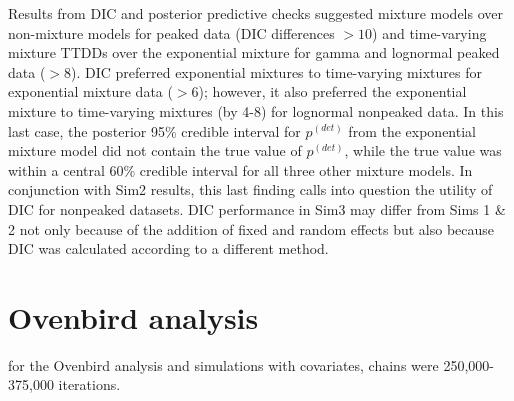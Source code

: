 \documentclass[useAMS,usenatbib,referee,12pt]{article}
\newcommand{\adam}[1]{{\color{blue} ADAM: #1}}
\newcommand{\pdet}{p^{(det)}}
\begin{document}
Results from DIC and posterior predictive checks suggested mixture models over non-mixture models for peaked data (DIC differences $>10$) and time-varying mixture TTDDs over the exponential mixture for gamma and lognormal peaked data ($>8$).
DIC preferred exponential mixtures to time-varying mixtures for exponential mixture data ($>6$); however, it also preferred the exponential mixture to time-varying mixtures (by 4-8) for lognormal nonpeaked data.  
In this last case, the posterior 95\% credible interval for $\pdet$ from the exponential mixture model did not contain the true value of $\pdet$, while the true value was within a central 60\% credible interval for all three other mixture models.  
In conjunction with Sim2 results, this last finding calls into question the utility of DIC for nonpeaked datasets.
DIC performance in Sim3 may differ from Sims 1 \& 2 not only because of the addition of fixed and random effects but also because DIC was calculated according to a different method.








\section{Ovenbird analysis}\label{sec:ovenbirds}

for the Ovenbird analysis and simulations with covariates, chains were 250,000-375,000 iterations. 
\end{document}
